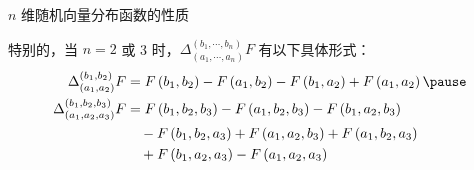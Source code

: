 \begin{frame}{$n$ 维随机向量分布函数的性质}

特别的，当 $n=2$ 或 3 时，$\Delta_{\left (a_{1}, \cdots, a_{n}\right)}^{\left (b_{1}, \cdots, b_{n}\right)} F$ 有以下具体形式：
\begin{align*}
	\Delta_{\left(a_{1}, a_{2}\right)}^{\left(b_{1}, b_{2}\right)} F&= F\left(b_{1}, b_{2}\right)-F\left(a_{1}, b_{2}\right)-F\left(b_{1}, a_{2}\right)+F\left(a_{1}, a_{2}\right) \pause \\
	\Delta_{\left(a_{1}, a_{2}, a_{3}\right)}^{\left(b_{1}, b_{2}, b_{3}\right)} F&= F\left(b_{1}, b_{2}, b_{3}\right)-F\left(a_{1}, b_{2}, b_{3}\right)-F\left(b_{1}, a_{2}, b_{3}\right)\\
	&\quad -F\left(b_{1}, b_{2}, a_{3}\right) +F\left(a_{1}, a_{2}, b_{3}\right)+F\left(a_{1}, b_{2}, a_{3}\right)\\
	&\quad +F\left(b_{1}, a_{2}, a_{3}\right)-F\left(a_{1}, a_{2}, a_{3}\right)
\end{align*}





\end{frame}


